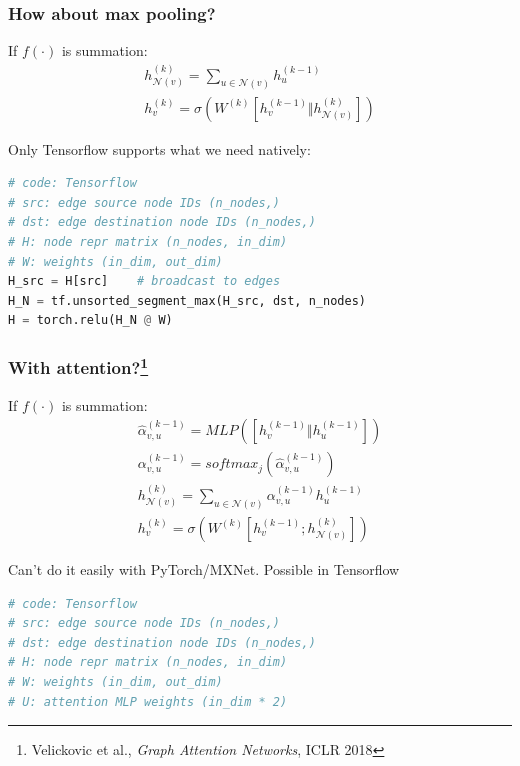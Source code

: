 \documentclass[11pt,aspectratio=169]{beamer}
\begin{document}
	\begin{frame}[fragile]
		\frametitle{How about max pooling?}
		
		\begin{minipage}{0.4\textwidth}
			If $f(\cdot)$ is summation:
			$$
			\begin{gathered}
			h_{\mathcal{N}(v)}^{(k)} =
			\sum_{u \in \mathcal{N}(v)} h^{(k-1)}_u \\
			h^{(k)}_v =
			\sigma \left( W^{(k)} \left[h_v^{(k-1)} \Vert h_{\mathcal{N}(v)}^{(k)}\right] \right)
			\end{gathered}
			$$
		\end{minipage}\hfill%
		\begin{minipage}{0.5\textwidth}
			Only Tensorflow supports what we need natively:
\begin{lstlisting}[language=Python]
# code: Tensorflow
# src: edge source node IDs (n_nodes,)
# dst: edge destination node IDs (n_nodes,)
# H: node repr matrix (n_nodes, in_dim)
# W: weights (in_dim, out_dim)
H_src = H[src]    # broadcast to edges
H_N = tf.unsorted_segment_max(H_src, dst, n_nodes)
H = torch.relu(H_N @ W)
\end{lstlisting}
		\end{minipage}
	\end{frame}

	\begin{frame}[fragile]
		\frametitle{With attention?\footnote{Velickovic et al., \emph{Graph Attention Networks}, ICLR 2018}}
		\begin{minipage}{0.4\textwidth}
			If $f(\cdot)$ is summation:
			$$
			\begin{gathered}
			\hat\alpha ^{(k-1)}_{v,u} = MLP\left(\left[h_v^{(k-1)} \Vert h_u^{(k-1)}\right]\right) \\
			\alpha^{(k-1)}_{v,u} = softmax_j\left(
			\hat\alpha ^{(k-1)}_{v,u}
			\right)\\
			h_{\mathcal{N}(v)}^{(k)} =
			\sum_{u \in \mathcal{N}(v)} \alpha^{(k-1)}_{v,u} h^{(k-1)}_u \\
			h^{(k)}_v =
			\sigma \left( W^{(k)} \left[h_v^{(k-1)}; h_{\mathcal{N}(v)}^{(k)}\right] \right)
			\end{gathered}
			$$
		\end{minipage}\hfill%
		\begin{minipage}{0.5\textwidth}
			Can't do it easily with PyTorch/MXNet.  Possible in Tensorflow
			\begin{lstlisting}[language=Python]
# code: Tensorflow
# src: edge source node IDs (n_nodes,)
# dst: edge destination node IDs (n_nodes,)
# H: node repr matrix (n_nodes, in_dim)
# W: weights (in_dim, out_dim)
# U: attention MLP weights (in_dim * 2)
			\end{lstlisting}
		\end{minipage}
	\end{frame}
\end{document}
